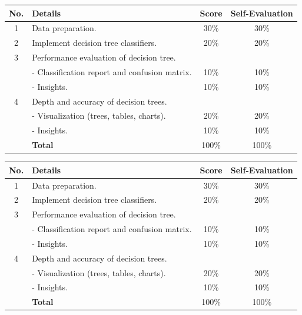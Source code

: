 \documentclass{article}
\begin{document}
\begin{table}[H]
    \centering
    \begin{tabular}{|c|p{9cm}|c|c|}
    \hline
    \textbf{No.} & \textbf{Details} & \textbf{Score} & \textbf{Self-Evaluation} \\
    \hline
    1 & Data preparation.  & 30\% & 30\%\\
    \hline
    2 & Implement decision tree classifiers. & 20\% & 20\%\\
    \hline
    3 & Performance evaluation of decision tree. &  & \\
    \hline
    & - Classification report and confusion matrix. & 10\% & 10\%\\
    \hline
    & - Insights. & 10\% & 10\%\\
    \hline
    4 & Depth and accuracy of decision trees. &  & \\
    \hline
    & - Visualization (trees, tables, charts). & 20\% & 20\%\\
    \hline
    & - Insights. & 10\% & 10\%\\
    \hline
    & \textbf{Total} & 100\% & 100\% \\
    \hline
    \end{tabular}
\end{table}

\begin{table}[H]
    \centering
    \begin{tabular}{|c|p{9cm}|c|c|}
    \hline
    \textbf{No.} & \textbf{Details} & \textbf{Score} & \textbf{Self-Evaluation} \\
    \hline
    1 & Data preparation.  & 30\% & 30\%\\
    \hline
    2 & Implement decision tree classifiers. & 20\% & 20\%\\
    \hline
    3 & Performance evaluation of decision tree. &  & \\
    \hline
    & - Classification report and confusion matrix. & 10\% & 10\%\\
    \hline
    & - Insights. & 10\% & 10\%\\
    \hline
    4 & Depth and accuracy of decision trees. &  & \\
    \hline
    & - Visualization (trees, tables, charts). & 20\% & 20\%\\
    \hline
    & - Insights. & 10\% & 10\%\\
    \hline
    & \textbf{Total} & 100\% & 100\% \\
    \hline
    \end{tabular}
\end{table}
\end{document}
